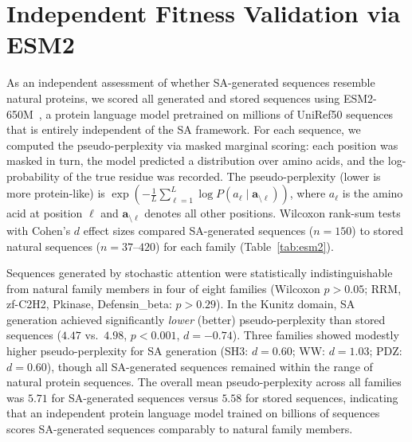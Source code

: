 \documentclass[10pt]{article}
\begin{document}
\section{Independent Fitness Validation via ESM2}\label{si:esm2}

As an independent assessment of whether SA-generated sequences resemble natural proteins, we scored all generated and stored sequences using ESM2-650M~\cite{linEvolutionaryScaleModeling2023}, a protein language model pretrained on millions of UniRef50 sequences that is entirely independent of the SA framework. For each sequence, we computed the pseudo-perplexity via masked marginal scoring: each position was masked in turn, the model predicted a distribution over amino acids, and the log-probability of the true residue was recorded. The pseudo-perplexity (lower is more protein-like) is $\exp(-\frac{1}{L}\sum_{\ell=1}^{L} \log P(a_\ell \mid \mathbf{a}_{\setminus \ell}))$, where $a_\ell$ is the amino acid at position $\ell$ and $\mathbf{a}_{\setminus \ell}$ denotes all other positions. Wilcoxon rank-sum tests with Cohen's $d$ effect sizes compared SA-generated sequences ($n{=}150$) to stored natural sequences ($n{=}37$--$420$) for each family (Table~\ref{tab:esm2}).

Sequences generated by stochastic attention were statistically indistinguishable from natural family members in four of eight families (Wilcoxon $p > 0.05$; RRM, zf-C2H2, Pkinase, Defensin\_beta: $p > 0.29$). In the Kunitz domain, SA generation achieved significantly \emph{lower} (better) pseudo-perplexity than stored sequences ($4.47$ vs.\ $4.98$, $p < 0.001$, $d{=}{-}0.74$). Three families showed modestly higher pseudo-perplexity for SA generation (SH3: $d{=}0.60$; WW: $d{=}1.03$; PDZ: $d{=}0.60$), though all SA-generated sequences remained within the range of natural protein sequences. The overall mean pseudo-perplexity across all families was $5.71$ for SA-generated sequences versus $5.58$ for stored sequences, indicating that an independent protein language model trained on billions of sequences scores SA-generated sequences comparably to natural family members.
\end{document}
